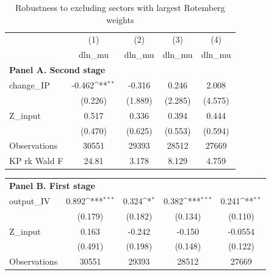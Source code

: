 \begin{table}[htbp]\centering
\def\sym#1{\ifmmode^{#1}\else\(^{#1}\)\fi}
\caption{Robustness to excluding sectors with largest Rotemberg weights}
\begin{tabular}{l*{4}{c}}
\hline\hline
            &\multicolumn{1}{c}{(1)}&\multicolumn{1}{c}{(2)}&\multicolumn{1}{c}{(3)}&\multicolumn{1}{c}{(4)}\\
            &\multicolumn{1}{c}{dln\_mu}&\multicolumn{1}{c}{dln\_mu}&\multicolumn{1}{c}{dln\_mu}&\multicolumn{1}{c}{dln\_mu}\\
\hline \multicolumn{5}{l}{\textbf{Panel A. Second stage}}\\
change\_IP   &      -0.462\sym{**} &      -0.316         &       0.246         &       2.008         \\
            &     (0.226)         &     (1.889)         &     (2.285)         &     (4.575)         \\
[1em]
Z\_input     &       0.517         &       0.336         &       0.394         &       0.444         \\
            &     (0.470)         &     (0.625)         &     (0.553)         &     (0.594)         \\
\hline
Observations&       30551         &       29393         &       28512         &       27669         \\
KP rk Wald F&       24.81         &       3.178         &       8.129         &       4.759         \\
\hline\hline
\end{tabular}
\end{table}
{
\def\sym#1{\ifmmode^{#1}\else\(^{#1}\)\fi}
\begin{tabular}{l*{4}{c}}
\hline\hline
\hline \multicolumn{5}{l}{\textbf{Panel B. First stage}}\\
output\_IV   &       0.892\sym{***}&       0.324\sym{*}  &       0.382\sym{***}&       0.241\sym{**} \\
            &     (0.179)         &     (0.182)         &     (0.134)         &     (0.110)         \\
[1em]
Z\_input     &       0.163         &      -0.242         &      -0.150         &     -0.0554         \\
            &     (0.491)         &     (0.198)         &     (0.148)         &     (0.122)         \\
\hline
Observations&       30551         &       29393         &       28512         &       27669         \\
\hline\hline
\end{tabular}
}
